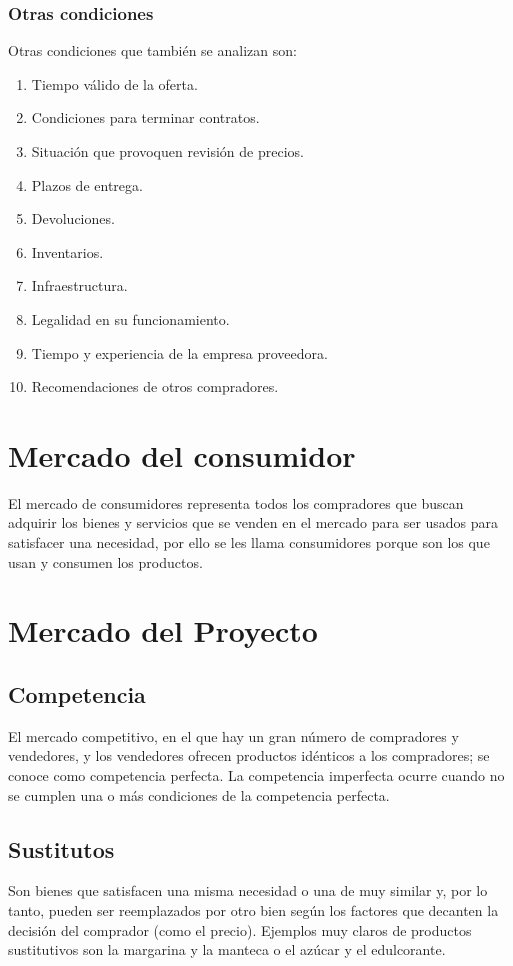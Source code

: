 \documentclass[../main]{subfiles}
\begin{document}
\subsubsection{Otras condiciones}
Otras condiciones que también se analizan son:
\begin{enumerate}
    \item Tiempo válido de la oferta.
\item Condiciones para terminar contratos.
\item Situación que provoquen revisión de precios.
\item Plazos de entrega.
\item Devoluciones.
\item Inventarios.
\item Infraestructura.
\item Legalidad en su funcionamiento.
\item Tiempo y experiencia de la empresa proveedora.
\item Recomendaciones de otros compradores.
\end{enumerate}


\section{Mercado del consumidor}
El mercado de consumidores representa todos los compradores que buscan adquirir los bienes y servicios que se venden en el mercado para ser usados para satisfacer una necesidad, por ello se les llama consumidores porque son los que usan y consumen los productos.

\section{Mercado del Proyecto}

\subsection{Competencia}
El mercado competitivo, en el que hay un gran número de compradores y vendedores, y los vendedores ofrecen productos idénticos a los compradores; se conoce como competencia perfecta. La competencia imperfecta ocurre cuando no se cumplen una o más condiciones de la competencia perfecta.

\subsection{Sustitutos}
Son bienes que satisfacen una misma necesidad o una de muy similar y, por lo tanto, pueden ser reemplazados por otro bien según los factores que decanten la decisión del comprador (como el precio). Ejemplos muy claros de productos sustitutivos son la margarina y la manteca o el azúcar y el edulcorante.
\end{document}
